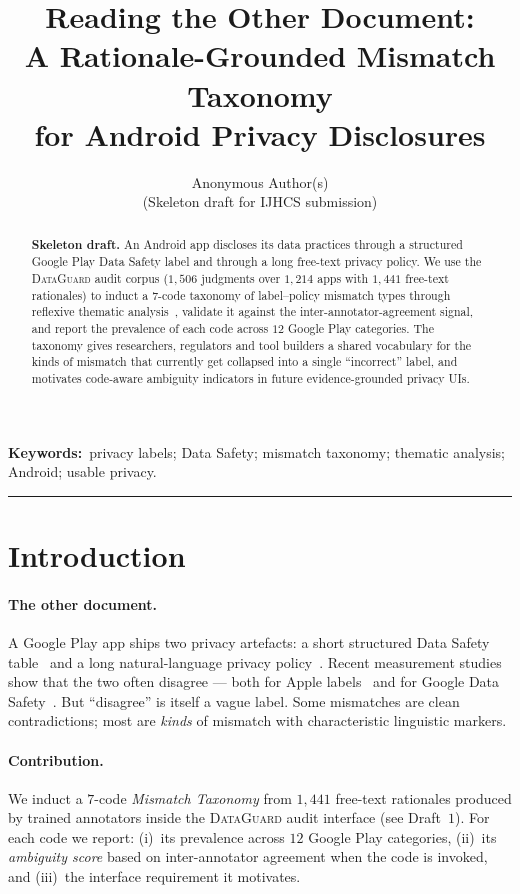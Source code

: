 \documentclass[11pt,a4paper]{article}
\title{\bfseries Reading the Other Document: \\
A Rationale-Grounded Mismatch Taxonomy \\
for Android Privacy Disclosures}
\author{Anonymous Author(s)\\\small (Skeleton draft for IJHCS submission)}
\date{}
\newcommand{\dataguard}{\textsc{DataGuard}}
\begin{document}
\maketitle

\begin{abstract}
\noindent
\textbf{Skeleton draft.} An Android app discloses its data practices
through a structured Google Play Data Safety label and through a long
free-text privacy policy. We use the \dataguard{} audit corpus
($1{,}506$ judgments over $1{,}214$ apps with $1{,}441$ free-text
rationales) to induct a $7$-code taxonomy of label--policy mismatch types
through reflexive thematic
analysis~\citep{braun2006using,wilson2016creation}, validate it against
the inter-annotator-agreement signal, and report the prevalence of each
code across $12$ Google Play categories. The taxonomy gives researchers,
regulators and tool builders a shared vocabulary for the kinds of
mismatch that currently get collapsed into a single ``incorrect'' label,
and motivates code-aware ambiguity indicators in future evidence-grounded
privacy UIs.
\end{abstract}

\noindent\textbf{Keywords:}\ privacy labels; Data Safety; mismatch
taxonomy; thematic analysis; Android; usable privacy.

\bigskip\hrule\bigskip

\section{Introduction}\label{sec:intro}
\paragraph{The other document.}
A Google Play app ships two privacy artefacts: a short structured Data
Safety table~\citep{googledatasafety2022} and a long natural-language
privacy policy~\citep{mcdonald2008cost,fabian2017large}. Recent
measurement studies show that the two often disagree --- both for Apple
labels~\citep{xiao2023lalaine} and for Google Data
Safety~\citep{khandelwal2024unpacking}. But ``disagree'' is itself a
vague label. Some mismatches are clean contradictions; most are
\emph{kinds} of mismatch with characteristic linguistic markers.

\paragraph{Contribution.}
We induct a $7$-code \emph{Mismatch Taxonomy} from $1{,}441$ free-text
rationales produced by trained annotators inside the
\dataguard{} audit interface (see Draft~$1$). For each code we report:
(i)~its prevalence across $12$ Google Play categories, (ii)~its
\emph{ambiguity score} based on inter-annotator agreement when the code
is invoked, and (iii)~the interface requirement it motivates.
\end{document}
